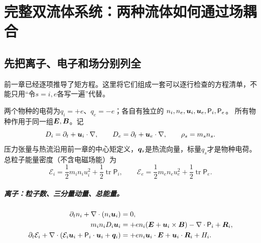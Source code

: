 \chapter{完整双流体系统：两种流体如何通过场耦合}\section{先把离子、电子和场分别列全}\label{hall:sec:full-twofluid}
前一章已经逐项推导了矩方程。这里将它们组成一套可以逐行检查的方程清单，不能只用“令$s=i,e$各写一遍”代替。

两个物种的电荷为$q_i=+e$、$q_e=-e$；各自有独立的
$n_i,n_e,\bm{u}_i,\bm{u}_e,\mathsf P_i,\mathsf P_e$。
所有物种作用于同一组$\bm{E},\bm{B}$。记
\begin{equation}
 D_i=\partial_t+\bm{u}_i\cdot\nabla,\qquad
 D_e=\partial_t+\bm{u}_e\cdot\nabla,\qquad \rho_s=m_sn_s.
\end{equation}
压力张量与热流沿用前一章的中心矩定义，$\bm{q}_s$是热流向量，标量$q_s$才是物种电荷。总粒子能量密度（不含电磁场能）为
\begin{equation}
 \mathcal E_i=\frac12m_in_i u_i^2+\frac12\operatorname{tr}\mathsf P_i,\qquad
 \mathcal E_e=\frac12m_en_e u_e^2+\frac12\operatorname{tr}\mathsf P_e.
 \label{hall:eq:twofluid-energy-def}
\end{equation}

\paragraph{离子：粒子数、三分量动量、总能量。}
\begin{align}
 \partial_t n_i+\nabla\cdot(n_i\bm{u}_i)&=0,
 \label{hall:eq:ion-cont-full}\\
 m_in_iD_i\bm{u}_i
 &=+en_i(\bm{E}+\bm{u}_i\times\bm{B})-\nabla\cdot\mathsf P_i+\bm{R}_i,
 \label{hall:eq:ion-mom-full}\\
 \partial_t\mathcal E_i+
 \nabla\cdot(\mathcal E_i\bm{u}_i+\mathsf P_i\cdot\bm{u}_i+\bm{q}_i)
 &=+en_i\bm{u}_i\cdot\bm{E}+\bm{u}_i\cdot\bm{R}_i+H_i.
 \label{hall:eq:ion-energy-full}
\end{align}
